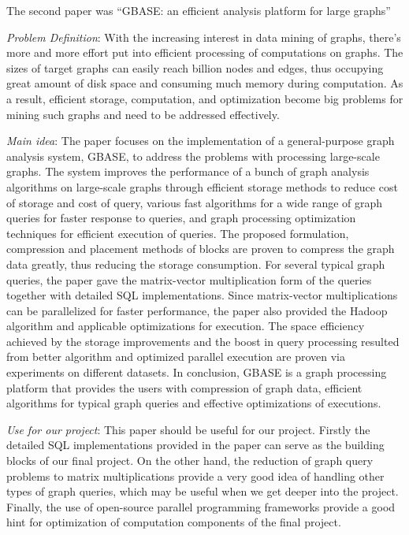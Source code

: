 \newpage
The second paper was ``GBASE: an efficient analysis platform for large graphs''
\begin{itemize*}
\item {\em Problem Definition}: With the increasing interest in data mining of graphs, there’s more and more effort put into efficient processing of computations on graphs. The sizes of target graphs can easily reach billion nodes and edges, thus occupying great amount of disk space and consuming much memory during computation. As a result, efficient storage, computation, and optimization become big problems for mining such graphs and need to be addressed effectively.\\

\item {\em Main idea}: The paper focuses on the implementation of a general-purpose graph analysis system, GBASE, to address the problems with processing large-scale graphs. The system improves the performance of a bunch of graph analysis algorithms on large-scale graphs through efficient storage methods to reduce cost of storage and cost of query, various fast algorithms for a wide range of graph queries for faster response to queries, and graph processing optimization techniques for efficient execution of queries. The proposed formulation, compression and placement methods of blocks are proven to compress the graph data greatly, thus reducing the storage consumption. For several typical graph queries, the paper gave the matrix-vector multiplication form of the queries together with detailed SQL implementations. Since matrix-vector multiplications can be parallelized for faster performance, the paper also provided the Hadoop algorithm and applicable optimizations for execution. The space efficiency achieved by the storage improvements and the boost in query processing resulted from better algorithm and optimized parallel execution are proven via experiments on different datasets. In conclusion, GBASE is a graph processing platform that provides the users with compression of graph data, efficient algorithms for typical graph queries and effective optimizations of executions.\\
\item {\em Use for our project}:
      This paper should be useful for our project. Firstly the detailed SQL implementations provided in the paper can serve as the building blocks of our final project. On the other hand, the reduction of graph query problems to matrix multiplications provide a very good idea of handling other types of graph queries, which may be useful when we get deeper into the project. Finally, the use of open-source parallel programming frameworks provide a good hint for optimization of computation components of the final project.\\

\end{itemize*}
